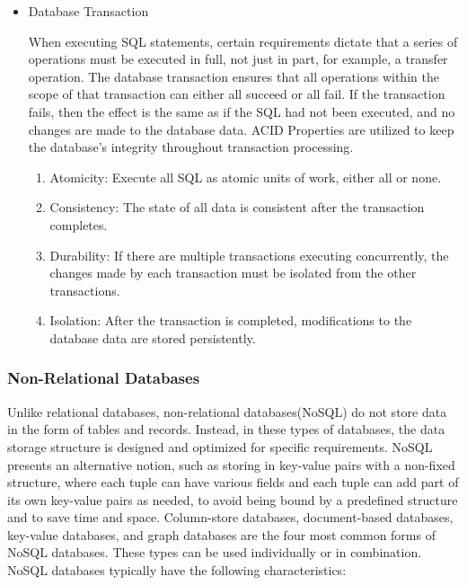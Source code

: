 \begin{itemize}
    \item Database Transaction
    
    When executing SQL statements, certain requirements dictate that a series of operations must be executed in full, not just in part, for example, a transfer operation. The database transaction ensures that all operations within the scope of that transaction can either all succeed or all fail. If the transaction fails, then the effect is the same as if the SQL had not been executed, and no changes are made to the database data. ACID Properties are utilized to keep the database's integrity throughout transaction processing\cite{peterson_2021}.
    
    \begin{enumerate}
        \item Atomicity: Execute all SQL as atomic units of work, either all or none.
        
        \item Consistency: The state of all data is consistent after the transaction completes. 
        
        \item Durability: If there are multiple transactions executing concurrently, the changes made by each transaction must be isolated from the other transactions.
        
        \item Isolation: After the transaction is completed, modifications to the database data are stored persistently.
    \end{enumerate}
\end{itemize}

\subsubsection{Non-Relational Databases}

Unlike relational databases, non-relational databases(NoSQL) do not store data in the form of tables and records. Instead, in these types of databases, the data storage structure is designed and optimized for specific requirements. NoSQL presents an alternative notion, such as storing in key-value pairs with a non-fixed structure, where each tuple can have various fields and each tuple can add part of its own key-value pairs as needed, to avoid being bound by a predefined structure and to save time and space\cite{menegasso_2018}. Column-store databases, document-based databases, key-value databases, and graph databases are the four most common forms of NoSQL databases. These types can be used individually or in combination. NoSQL databases typically have the following characteristics:

